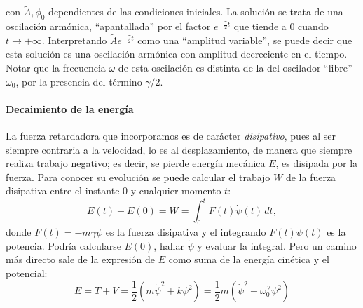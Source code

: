 \documentclass[a4paper,spanish]{article}
\numberwithin{equation}{section}
\begin{document}
con $\tilde{A}, \phi_0$ dependientes de las condiciones iniciales. La soluci\'on se trata de una oscilaci\'on arm\'onica, ``apantallada'' por el factor $e^{-\frac{\gamma}{2}t}$ que tiende a 0 cuando $t\to+\infty$. Interpretando $\tilde{A}e^{-\frac{\gamma}{2}t}$ como una ``amplitud variable'', se puede decir que esta soluci\'on es una oscilaci\'on arm\'onica con amplitud decreciente en el tiempo. Notar que la frecuencia $\omega$ de esta oscilaci\'on es distinta de la del oscilador ``libre'' $\omega_0$, por la presencia del t\'ermino $\gamma/2$.
		
	
	

	
	


    
\paragraph{Decaimiento de la energ\'ia}

La fuerza retardadora que incorporamos es de car\'acter \textit{disipativo}, pues al ser siempre contraria a la velocidad, lo es al desplazamiento, de manera que siempre realiza trabajo negativo; es decir, se pierde energ\'ia mec\'anica $E$, es disipada por la fuerza. Para conocer su evoluci\'on se puede calcular el trabajo $W$ de la fuerza disipativa entre el instante 0 y cualquier momento $t$:
                \begin{equation}
			E(t) - E(0) = W = \int_0^{t} F(t)\dot{\psi}(t) \,dt,
		\end{equation}
donde $F(t) = -m\gamma\dot{\psi}$ es la fuerza disipativa y el integrando $F(t)\dot{\psi}(t)$ es la potencia. Podr\'ia calcularse $E(0)$, hallar $\dot{\psi}$ y evaluar la integral. Pero un camino m\'as directo sale de la expresi\'on de $E$ como suma de la energ\'ia cin\'etica y el potencial:
		\begin{equation}
			E = T + V = \frac{1}{2}(m\dot{\psi}^2+k\psi^2)
				= \frac{1}{2}m(\dot{\psi}^2+\omega_0^{\,2}\psi^2)
		\end{equation}
\end{document}
